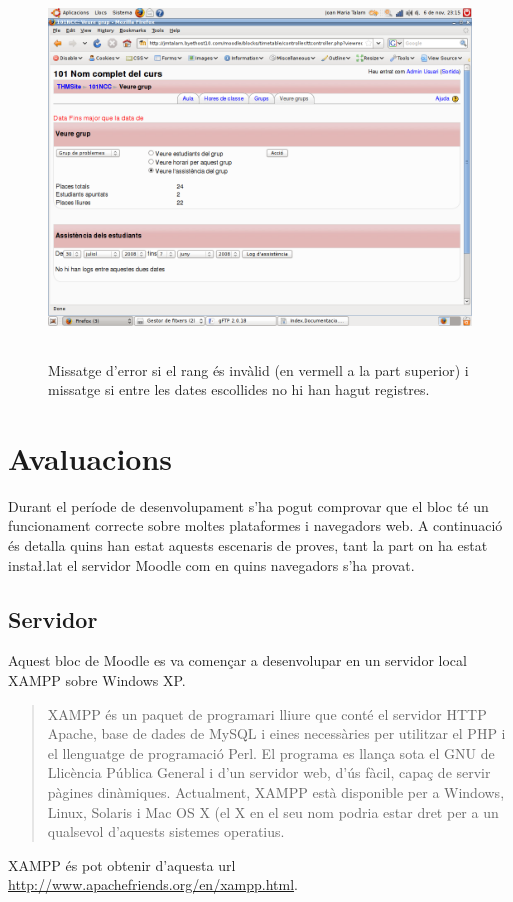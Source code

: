 \documentclass[a4paper]{report}  %
\begin{document}
\begin{itemize}
		\begin{figure}[H] %
		\begin{center}
		\includegraphics[height=10cm,width=12cm]{img/VeureGrupDatesNoValides.png}
		\caption[List caption]{Missatge d'error si el rang és invàlid (en vermell a la part superior) i missatge si entre les dates escollides no hi han hagut registres.}
		\label{fig:VeureGrupDatesNoValides}
		\end{center}
		\end{figure}
\end{itemize}

\chapter{Avaluacions} 
Durant el període de desenvolupament s'ha pogut comprovar que el bloc té un funcionament correcte sobre moltes plataformes i navegadors web. A continuació és detalla quins han estat aquests escenaris de proves, tant la part on ha estat insta\l.lat el servidor Moodle com en quins navegadors s'ha provat.
\section{Servidor}
Aquest bloc de Moodle es va començar a desenvolupar en un servidor local XAMPP sobre Windows XP.\\
\begin{quote}
XAMPP és un paquet de programari lliure que conté el servidor HTTP Apache, base de dades de MySQL i eines necessàries per utilitzar el PHP i el llenguatge de programació Perl. El programa es llança sota el GNU de Llicència Pública General i d'un servidor web, d'ús fàcil, capaç de servir pàgines dinàmiques. Actualment, XAMPP està disponible per a Windows, Linux, Solaris i Mac OS X (el X en el seu nom podria estar dret per a un qualsevol d'aquests sistemes operatius.
\end{quote}
XAMPP és pot obtenir d'aquesta url \url{http://www.apachefriends.org/en/xampp.html}.\\
\end{document}
